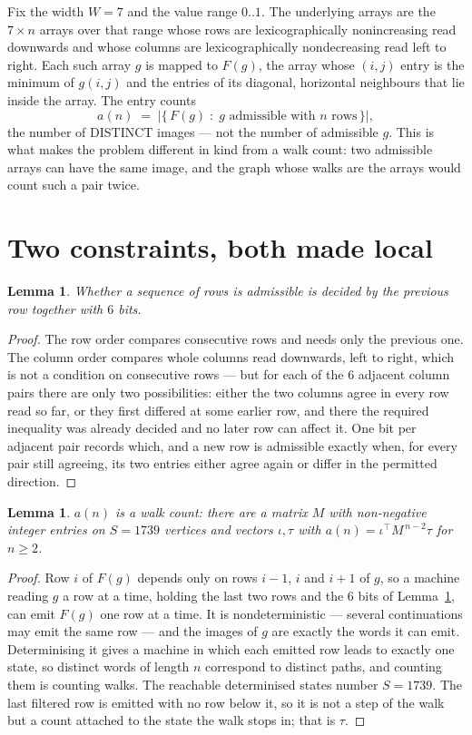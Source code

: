 \documentclass[11pt,a4paper]{article}
\theoremstyle{plain}
\newtheorem{lemma}[theorem]{Lemma}
\theoremstyle{definition}
\begin{document}
Fix the width $W=7$ and the value range $0..1$. The underlying arrays are the
$7\times n$ arrays over that range whose rows are lexicographically nonincreasing read downwards
and whose columns are lexicographically nondecreasing read left to right. Each such array $g$
is mapped to $F(g)$, the array whose $(i,j)$ entry is the minimum of $g(i,j)$ and the entries
of its diagonal, horizontal neighbours that lie inside the array. The entry counts
\[
a(n)\;=\;\bigl|\{\,F(g)\;:\;g\text{ admissible with }n\text{ rows}\,\}\bigr|,
\]
the number of DISTINCT images --- not the number of admissible $g$. This is what makes the
problem different in kind from a walk count: two admissible arrays can have the same image, and
the graph whose walks are the arrays would count such a pair twice.

\section{Two constraints, both made local}

\begin{lemma}\label{lem:local}
Whether a sequence of rows is admissible is decided by the previous row together with
$6$ bits.
\end{lemma}

\begin{proof}
The row order compares consecutive rows and needs only the previous one. The column order
compares whole columns read downwards, left to right, which is not a condition on consecutive
rows --- but for each of the $6$ adjacent column pairs there are only two possibilities:
either the two columns agree in every row read so far, or they first differed at some earlier
row, and there the required inequality was already decided and no later row can affect it. One
bit per adjacent pair records which, and a new row is admissible exactly when, for every pair
still agreeing, its two entries either agree again or differ in the permitted direction.
\end{proof}

\begin{lemma}\label{lem:det}
$a(n)$ is a walk count: there are a matrix $M$ with non-negative integer entries on $S=1739$
vertices and vectors $\iota,\tau$ with $a(n)=\iota^{\!\top}M^{\,n-2}\tau$ for $n\ge2$.
\end{lemma}

\begin{proof}
Row $i$ of $F(g)$ depends only on rows $i-1$, $i$ and $i+1$ of $g$, so a machine reading $g$ a
row at a time, holding the last two rows and the $6$ bits of Lemma~\ref{lem:local}, can
emit $F(g)$ one row at a time. It is nondeterministic --- several continuations may emit the
same row --- and the images of $g$ are exactly the words it can emit. Determinising it gives a
machine in which each emitted row leads to exactly one state, so distinct words of length $n$
correspond to distinct paths, and counting them is counting walks. The reachable determinised
states number $S=1739$. The last filtered row is emitted with no row below it, so it is not a
step of the walk but a count attached to the state the walk stops in; that is $\tau$.
\end{proof}
\end{document}
